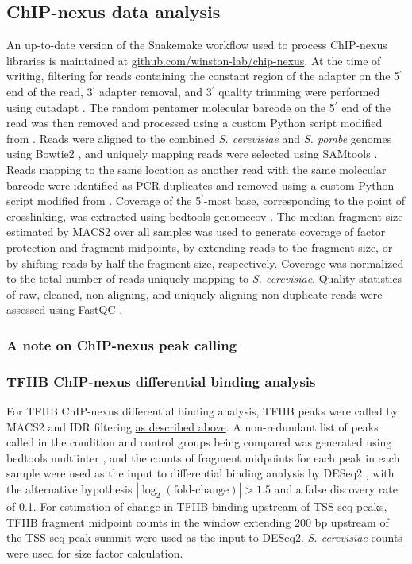 \subsection{ChIP-nexus data analysis}
An up-to-date version of the Snakemake \citep{koster2012} workflow used to process ChIP-nexus libraries is maintained at \href{https://github.com/winston-lab/chip-nexus}{github.com/winston-lab/chip-nexus}.
At the time of writing, filtering for reads containing the constant region of the adapter on the 5$^\prime$ end of the read, 3$^\prime$ adapter removal, and 3$^\prime$ quality trimming were performed using cutadapt \citep{martin2011}.
The random pentamer molecular barcode on the 5$^\prime$ end of the read was then removed and processed using a custom Python script modified from \citet{mayer2015}.
Reads were aligned to the combined \textit{S. cerevisiae} and \textit{S. pombe} genomes using Bowtie2 \citep{langmead2012}, and uniquely mapping reads were selected using SAMtools \citep{li2009}.
Reads mapping to the same location as another read with the same molecular barcode were identified as PCR duplicates and removed using a custom Python script modified from \citet{mayer2015}.
Coverage of the 5$^\prime$-most base, corresponding to the point of crosslinking, was extracted using bedtools genomecov \citep{quinlan2010}.
The median fragment size estimated by MACS2 \citep{zhang2008} over all samples was used to generate coverage of factor protection and fragment midpoints, by extending reads to the fragment size, or by shifting reads by half the fragment size, respectively.
Coverage was normalized to the total number of reads uniquely mapping to \textit{S. cerevisiae}.
Quality statistics of raw, cleaned, non-aligning, and uniquely aligning non-duplicate reads were assessed using FastQC \cite{andrews2014}.

\subsubsection{A note on ChIP-nexus peak calling}
\label{subsubsec:tfiib_peak_calling}

\subsubsection{TFIIB ChIP-nexus differential binding analysis}
For TFIIB ChIP-nexus differential binding analysis, TFIIB peaks were called by MACS2 and IDR filtering \hyperref[subsubsec:tfiib_peak_calling]{as described above}.
A non-redundant list of peaks called in the condition and control groups being compared was generated using bedtools multiinter \citep{quinlan2010}, and the counts of fragment midpoints for each peak in each sample were used as the input to differential binding analysis by DESeq2 \citep{love2014}, with the alternative hypothesis $\allowbreak \left\lvert\log_2 \left(\text{fold-change}\right) \right\rvert > 1.5$ and a false discovery rate of 0.1.
For estimation of change in TFIIB binding upstream of TSS-seq peaks, TFIIB fragment midpoint counts in the window extending 200 bp upstream of the TSS-seq peak summit were used as the input to DESeq2.
\textit{S. cerevisiae} counts were used for size factor calculation.


